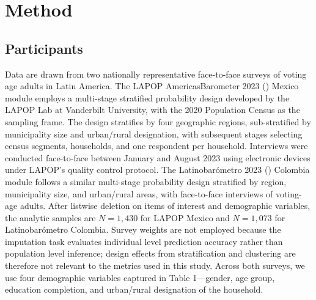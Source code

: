 \documentclass[
  man,
  floatsintext,
  longtable,
  nolmodern,
  notxfonts,
  notimes,
  colorlinks=true,linkcolor=blue,citecolor=blue,urlcolor=blue]{apa7}
\begin{document}
\section{Method}\label{method}

\subsection{Participants}\label{participants}

Data are drawn from two nationally representative face-to-face surveys
of voting age adults in Latin America. The LAPOP AmericasBarometer 2023
() Mexico module employs a
multi-stage stratified probability design developed by the LAPOP Lab at
Vanderbilt University, with the 2020 Population Census as the sampling
frame. The design stratifies by four geographic regions, sub-stratified
by municipality size and urban/rural designation, with subsequent stages
selecting census segments, households, and one respondent per household.
Interviews were conducted face-to-face between January and August 2023
using electronic devices under LAPOP's quality control protocol. The
Latinobarómetro 2023 () Colombia module follows a similar multi-stage
probability design stratified by region, municipality size, and
urban/rural areas, with face-to-face interviews of voting-age adults.
After listwise deletion on items of interest and demographic variables,
the analytic samples are \(N = 1{,}430\) for LAPOP Mexico and
\(N = 1{,}073\) for Latinobarómetro Colombia. Survey weights are not
employed because the imputation task evaluates individual level
prediction accuracy rather than population level inference; design
effects from stratification and clustering are therefore not relevant to
the metrics used in this study. Across both surveys, we use four
demographic variables captured in Table 1---gender, age group, education
completion, and urban/rural designation of the household.

\begin{table}
\centering
\caption{Demographic Variables Used in Study Across Both Surveys}
\centering
{}
\end{table}
\end{document}
